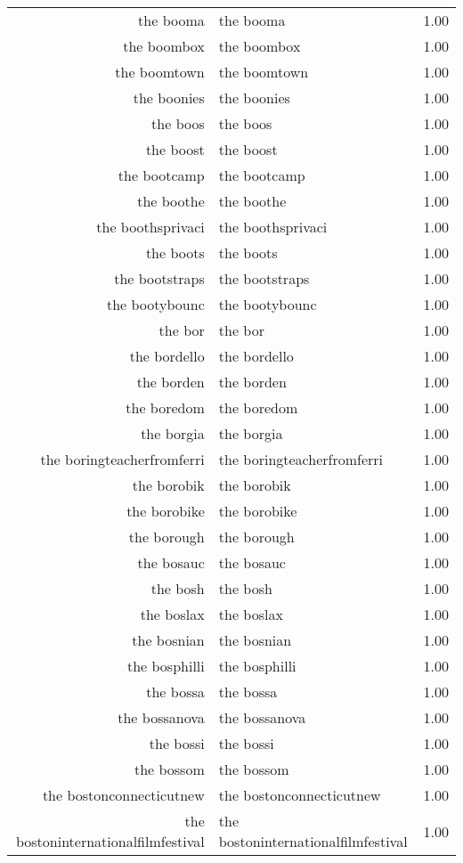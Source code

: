 \begin{table}[ht]
\begin{tabular}{rlr}
  the booma & the booma & 1.00 \\ 
  the boombox & the boombox & 1.00 \\ 
  the boomtown & the boomtown & 1.00 \\ 
  the boonies & the boonies & 1.00 \\ 
  the boos & the boos & 1.00 \\ 
  the boost & the boost & 1.00 \\ 
  the bootcamp & the bootcamp & 1.00 \\ 
  the boothe & the boothe & 1.00 \\ 
  the boothsprivaci & the boothsprivaci & 1.00 \\ 
  the boots & the boots & 1.00 \\ 
  the bootstraps & the bootstraps & 1.00 \\ 
  the bootybounc & the bootybounc & 1.00 \\ 
  the bor & the bor & 1.00 \\ 
  the bordello & the bordello & 1.00 \\ 
  the borden & the borden & 1.00 \\ 
  the boredom & the boredom & 1.00 \\ 
  the borgia & the borgia & 1.00 \\ 
  the boringteacherfromferri & the boringteacherfromferri & 1.00 \\ 
  the borobik & the borobik & 1.00 \\ 
  the borobike & the borobike & 1.00 \\ 
  the borough & the borough & 1.00 \\ 
  the bosauc & the bosauc & 1.00 \\ 
  the bosh & the bosh & 1.00 \\ 
  the boslax & the boslax & 1.00 \\ 
  the bosnian & the bosnian & 1.00 \\ 
  the bosphilli & the bosphilli & 1.00 \\ 
  the bossa & the bossa & 1.00 \\ 
  the bossanova & the bossanova & 1.00 \\ 
  the bossi & the bossi & 1.00 \\ 
  the bossom & the bossom & 1.00 \\ 
  the bostonconnecticutnew & the bostonconnecticutnew & 1.00 \\ 
  the bostoninternationalfilmfestival & the bostoninternationalfilmfestival & 1.00 \\ 

\end{tabular}
\end{table}
